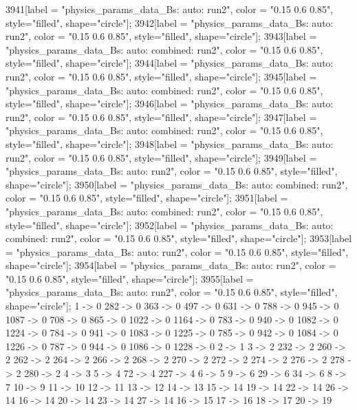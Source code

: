 {	3941[label = "physics_params_data_Bs\nfit: auto\nyear: run2", color = "0.15 0.6 0.85", style="filled", shape="circle"];
	3942[label = "physics_params_data_Bs\nfit: auto\nyear: run2", color = "0.15 0.6 0.85", style="filled", shape="circle"];
	3943[label = "physics_params_data_Bs\nfit: auto\ntrigger: combined\nyear: run2", color = "0.15 0.6 0.85", style="filled", shape="circle"];
	3944[label = "physics_params_data_Bs\nfit: auto\nyear: run2", color = "0.15 0.6 0.85", style="filled", shape="circle"];
	3945[label = "physics_params_data_Bs\nfit: auto\ntrigger: combined\nyear: run2", color = "0.15 0.6 0.85", style="filled", shape="circle"];
	3946[label = "physics_params_data_Bs\nfit: auto\nyear: run2", color = "0.15 0.6 0.85", style="filled", shape="circle"];
	3947[label = "physics_params_data_Bs\nfit: auto\ntrigger: combined\nyear: run2", color = "0.15 0.6 0.85", style="filled", shape="circle"];
	3948[label = "physics_params_data_Bs\nfit: auto\nyear: run2", color = "0.15 0.6 0.85", style="filled", shape="circle"];
	3949[label = "physics_params_data_Bs\nfit: auto\nyear: run2", color = "0.15 0.6 0.85", style="filled", shape="circle"];
	3950[label = "physics_params_data_Bs\nfit: auto\ntrigger: combined\nyear: run2", color = "0.15 0.6 0.85", style="filled", shape="circle"];
	3951[label = "physics_params_data_Bs\nfit: auto\ntrigger: combined\nyear: run2", color = "0.15 0.6 0.85", style="filled", shape="circle"];
	3952[label = "physics_params_data_Bs\nfit: auto\ntrigger: combined\nyear: run2", color = "0.15 0.6 0.85", style="filled", shape="circle"];
	3953[label = "physics_params_data_Bs\nfit: auto\nyear: run2", color = "0.15 0.6 0.85", style="filled", shape="circle"];
	3954[label = "physics_params_data_Bs\nfit: auto\nyear: run2", color = "0.15 0.6 0.85", style="filled", shape="circle"];
	3955[label = "physics_params_data_Bs\nfit: auto\nyear: run2", color = "0.15 0.6 0.85", style="filled", shape="circle"];
	1 -> 0
	282 -> 0
	363 -> 0
	497 -> 0
	631 -> 0
	788 -> 0
	945 -> 0
	1087 -> 0
	708 -> 0
	865 -> 0
	1022 -> 0
	1164 -> 0
	783 -> 0
	940 -> 0
	1082 -> 0
	1224 -> 0
	784 -> 0
	941 -> 0
	1083 -> 0
	1225 -> 0
	785 -> 0
	942 -> 0
	1084 -> 0
	1226 -> 0
	787 -> 0
	944 -> 0
	1086 -> 0
	1228 -> 0
	2 -> 1
	3 -> 2
	232 -> 2
	260 -> 2
	262 -> 2
	264 -> 2
	266 -> 2
	268 -> 2
	270 -> 2
	272 -> 2
	274 -> 2
	276 -> 2
	278 -> 2
	280 -> 2
	4 -> 3
	5 -> 4
	72 -> 4
	227 -> 4
	6 -> 5
	9 -> 6
	29 -> 6
	34 -> 6
	8 -> 7
	10 -> 9
	11 -> 10
	12 -> 11
	13 -> 12
	14 -> 13
	15 -> 14
	19 -> 14
	22 -> 14
	26 -> 14
	16 -> 14
	20 -> 14
	23 -> 14
	27 -> 14
	16 -> 15
	17 -> 16
	18 -> 17
	20 -> 19
}
